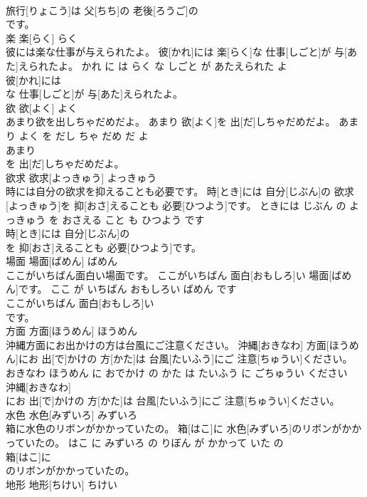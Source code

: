 \documentclass[8pt]{extreport}
\begin{document}
\begin{CJK}{UTF8}{min}
\\	旅行[りょこう]は 父[ちち]の 老後[ろうご]の
\\	です。			
\\	楽	楽[らく]	らく	
\\	彼には楽な仕事が与えられたよ。	彼[かれ]には 楽[らく]な 仕事[しごと]が 与[あた]えられたよ。	かれ に は らく な しごと が あたえられた よ	
\\	彼[かれ]には
\\	な 仕事[しごと]が 与[あた]えられたよ。			
\\	欲	欲[よく]	よく	
\\	あまり欲を出しちゃだめだよ。	あまり 欲[よく]を 出[だ]しちゃだめだよ。	あまり よく を だし ちゃ だめ だ よ	
\\	あまり
\\	を 出[だ]しちゃだめだよ。			
\\	欲求	欲求[よっきゅう]	よっきゅう	
\\	時には自分の欲求を抑えることも必要です。	時[とき]には 自分[じぶん]の 欲求[よっきゅう]を 抑[おさ]えることも 必要[ひつよう]です。	ときには じぶん の よっきゅう を おさえる こと も ひつよう です	
\\	時[とき]には 自分[じぶん]の
\\	を 抑[おさ]えることも 必要[ひつよう]です。			
\\	場面	場面[ばめん]	ばめん	
\\	ここがいちばん面白い場面です。	ここがいちばん 面白[おもしろ]い 場面[ばめん]です。	ここ が いちばん おもしろい ばめん です	
\\	ここがいちばん 面白[おもしろ]い
\\	です。			
\\	方面	方面[ほうめん]	ほうめん	
\\	沖縄方面にお出かけの方は台風にご注意ください。	沖縄[おきなわ] 方面[ほうめん]にお 出[で]かけの 方[かた]は 台風[たいふう]にご 注意[ちゅうい]ください。	おきなわ ほうめん に おでかけ の かた は たいふう に ごちゅうい ください	
\\	沖縄[おきなわ]
\\	にお 出[で]かけの 方[かた]は 台風[たいふう]にご 注意[ちゅうい]ください。			
\\	水色	水色[みずいろ]	みずいろ	
\\	箱に水色のリボンがかかっていたの。	箱[はこ]に 水色[みずいろ]のリボンがかかっていたの。	はこ に みずいろ の りぼん が かかって いた の	
\\	箱[はこ]に
\\	のリボンがかかっていたの。			
\\	地形	地形[ちけい]	ちけい	

\end{CJK}
\end{document}
